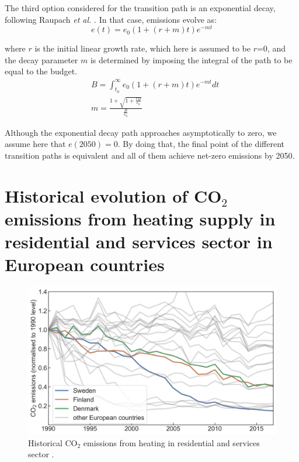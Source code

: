 \documentclass[3p]{elsarticle} %
\begin{document}
The third option considered for the transition path is an exponential decay, following Raupach \textit{et al. }\cite{Raupach_2014}. In that case, emissions evolve as:
\begin{equation}
e(t) = e_0(1+(r+m)t)e^{-mt}
\end{equation}

where $r$ is the initial linear growth rate, which here is assumed to be $r$=0, and the decay parameter $m$ is determined by imposing the integral of the path to be equal to the budget.
\begin{equation}
\begin{aligned}
& B=\int_{t_0}^{\infty} e_0(1+(r+m)t)e^{-mt} dt \\
& m=\frac{1+ \sqrt{1+\frac{rB}{e_0}}}{\frac{B}{e_0}}
\end{aligned}
\end{equation}

Although the exponential decay path approaches asymptotically to zero, we assume here that $e(2050)=0$. By doing that, the final point of the different transition paths is equivalent and all of them achieve net-zero emissions by 2050.

\section{Historical evolution of CO$_2$ emissions from heating supply in residential and services sector in European countries}

\begin{figure}[!h]
\centering
\includegraphics[width=12cm]{figures/emissions_heating.png}
\caption{Historical CO$_2$ emissions from heating in residential and services sector \cite{UNFCCC_inventory}. } \label{fig_emissions_heating} 
\end{figure}
\end{document}
